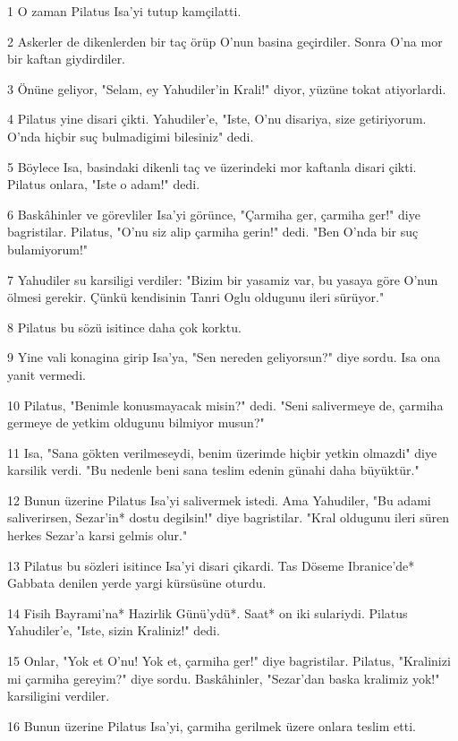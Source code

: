 \par 1 O zaman Pilatus Isa'yi tutup kamçilatti.
\par 2 Askerler de dikenlerden bir taç örüp O'nun basina geçirdiler. Sonra O'na mor bir kaftan giydirdiler.
\par 3 Önüne geliyor, "Selam, ey Yahudiler'in Krali!" diyor, yüzüne tokat atiyorlardi.
\par 4 Pilatus yine disari çikti. Yahudiler'e, "Iste, O'nu disariya, size getiriyorum. O'nda hiçbir suç bulmadigimi bilesiniz" dedi.
\par 5 Böylece Isa, basindaki dikenli taç ve üzerindeki mor kaftanla disari çikti. Pilatus onlara, "Iste o adam!" dedi.
\par 6 Baskâhinler ve görevliler Isa'yi görünce, "Çarmiha ger, çarmiha ger!" diye bagristilar. Pilatus, "O'nu siz alip çarmiha gerin!" dedi. "Ben O'nda bir suç bulamiyorum!"
\par 7 Yahudiler su karsiligi verdiler: "Bizim bir yasamiz var, bu yasaya göre O'nun ölmesi gerekir. Çünkü kendisinin Tanri Oglu oldugunu ileri sürüyor."
\par 8 Pilatus bu sözü isitince daha çok korktu.
\par 9 Yine vali konagina girip Isa'ya, "Sen nereden geliyorsun?" diye sordu. Isa ona yanit vermedi.
\par 10 Pilatus, "Benimle konusmayacak misin?" dedi. "Seni salivermeye de, çarmiha germeye de yetkim oldugunu bilmiyor musun?"
\par 11 Isa, "Sana gökten verilmeseydi, benim üzerimde hiçbir yetkin olmazdi" diye karsilik verdi. "Bu nedenle beni sana teslim edenin günahi daha büyüktür."
\par 12 Bunun üzerine Pilatus Isa'yi salivermek istedi. Ama Yahudiler, "Bu adami saliverirsen, Sezar'in* dostu degilsin!" diye bagristilar. "Kral oldugunu ileri süren herkes Sezar'a karsi gelmis olur."
\par 13 Pilatus bu sözleri isitince Isa'yi disari çikardi. Tas Döseme Ibranice'de* Gabbata denilen yerde yargi kürsüsüne oturdu.
\par 14 Fisih Bayrami'na* Hazirlik Günü'ydü*. Saat* on iki sulariydi. Pilatus Yahudiler'e, "Iste, sizin Kraliniz!" dedi.
\par 15 Onlar, "Yok et O'nu! Yok et, çarmiha ger!" diye bagristilar. Pilatus, "Kralinizi mi çarmiha gereyim?" diye sordu. Baskâhinler, "Sezar'dan baska kralimiz yok!" karsiligini verdiler.
\par 16 Bunun üzerine Pilatus Isa'yi, çarmiha gerilmek üzere onlara teslim etti.
